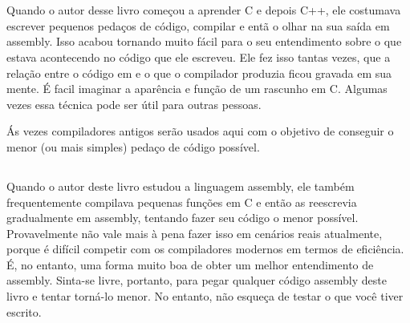 \chapter{\PTBRph{}}

Quando o autor desse livro começou a aprender C e depois C++, ele costumava escrever pequenos pedaços de código, compilar e entã o olhar na sua saída em assembly.
Isso acabou tornando muito fácil para o seu entendimento sobre o que estava acontecendo no código que ele escreveu.
Ele fez isso tantas vezes, que a relação entre o código em \CCpp e o que o compilador produzia ficou gravada em sua mente.
É facil imaginar a aparência e função de um rascunho em C. Algumas vezes essa técnica pode ser útil para outras pessoas.

Ás vezes compiladores antigos serão usados aqui com o objetivo de conseguir o menor (ou mais simples) pedaço de código possível.

\iffalse
Quando o autor deste livro começou a aprender C e, mais tarde, \Cpp, ele costumava escrever pequenos pedaços de código, compilá-los, 
e então olhar a saída em linguagem assembly. Isso tornou muito fácil para ele entender o que estava acontecendo no código que ele tinha escrito.
\footnote{Na verdade, ele ainda faz isso quando não consegue entender o que faz um determinado pedaço de código.}. 
Ele fez isso tantas vezes que o relacionamento entre o código \CCpp code e o que o compilador produzia ficou registrado profundamente em sua mente. 
É fácil imaginar de imediato um esboço da aparência e função do código C. 
Talvez essa técnica poderia ser útil para mais alguém.


Em determinadas partes foram usados aqui compiladores muito antigos, para se obter o menor (ou mais simples) snippet possível.
\fi

\ifdefined\IncludeExercises
\section*{\Exercises}

Quando o autor deste livro estudou a linguagem assembly, ele também frequentemente compilava pequenas funções em C e então as reescrevia gradualmente em assembly, tentando fazer seu código o menor possível.
Provavelmente não vale mais à pena fazer isso em cenários reais atualmente, 
porque é difícil competir com os compiladores modernos em termos de eficiência. É, no entanto, uma forma muito boa de obter um melhor entendimento de assembly.
Sinta-se livre, portanto, para pegar qualquer código assembly deste livro e tentar torná-lo menor.
No entanto, não esqueça de testar o que você tiver escrito.


